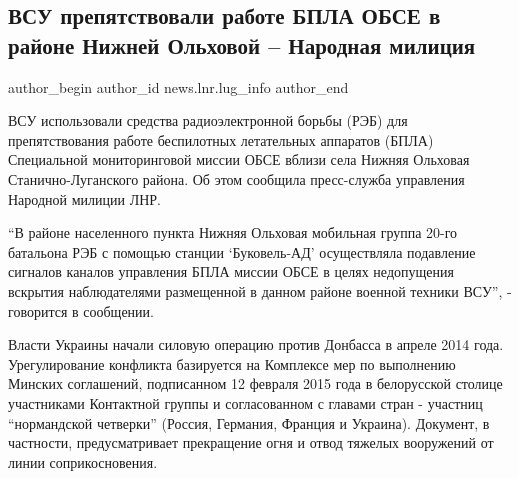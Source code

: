  
 
 
 
 
\subsection{ВСУ препятствовали работе БПЛА ОБСЕ в районе Нижней Ольховой – Народная милиция}
\label{sec:08_01_2022.stz.news.lnr.lug_info.1.vsu_obse}

\ifcmt
 author_begin
   author_id news.lnr.lug_info
 author_end
\fi

ВСУ использовали средства радиоэлектронной борьбы (РЭБ) для препятствования
работе беспилотных летательных аппаратов (БПЛА) Специальной мониторинговой
миссии ОБСЕ вблизи села Нижняя Ольховая Станично-Луганского района. Об этом
сообщила пресс-служба управления Народной милиции ЛНР.

\enquote{В районе населенного пункта Нижняя Ольховая мобильная группа 20-го батальона
РЭБ с помощью станции \enquote{Буковель-АД} осуществляла подавление сигналов каналов
управления БПЛА миссии ОБСЕ в целях недопущения вскрытия наблюдателями
размещенной в данном районе военной техники ВСУ}, - говорится в сообщении.

Власти Украины начали силовую операцию против Донбасса в апреле 2014 года.
Урегулирование конфликта базируется на Комплексе мер по выполнению Минских
соглашений, подписанном 12 февраля 2015 года в белорусской столице участниками
Контактной группы и согласованном с главами стран - участниц \enquote{нормандской
четверки} (Россия, Германия, Франция и Украина). Документ, в частности,
предусматривает прекращение огня и отвод тяжелых вооружений от линии
соприкосновения.
